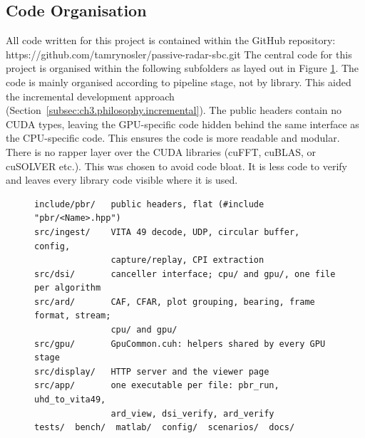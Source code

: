 
\subsection{Code Organisation}
\label{subsec:ch4.overview.code}

All code written for this project is contained within the GitHub repository: https://github.com/tamrynosler/passive-radar-sbc.git
The central code for this project is organised within the following subfolders as layed out in Figure \ref{fig:ch5.tree}.
The code is mainly organised according to pipeline stage, not by library. This aided the incremental development approach (Section~\ref{subsec:ch3.philosophy.incremental}).
The public headers contain no CUDA types, leaving the GPU-specific code hidden behind the same interface as the CPU-specific code. This ensures the code is more readable and modular.
There is no rapper layer over the CUDA libraries (cuFFT, cuBLAS, or cuSOLVER etc.). This was chosen to avoid code bloat. It is less code to verify and leaves every library code visible where it is used.


\begin{figure}[H]
    \centering
\begin{Verbatim}[frame=single,fontsize=\small]
include/pbr/   public headers, flat (#include "pbr/<Name>.hpp")
src/ingest/    VITA 49 decode, UDP, circular buffer, config,
               capture/replay, CPI extraction
src/dsi/       canceller interface; cpu/ and gpu/, one file per algorithm
src/ard/       CAF, CFAR, plot grouping, bearing, frame format, stream;
               cpu/ and gpu/
src/gpu/       GpuCommon.cuh: helpers shared by every GPU stage
src/display/   HTTP server and the viewer page
src/app/       one executable per file: pbr_run, uhd_to_vita49,
               ard_view, dsi_verify, ard_verify
tests/  bench/  matlab/  config/  scenarios/  docs/
\end{Verbatim}
    \caption[TODO]{}
    \label{fig:ch5.tree}
\end{figure}


